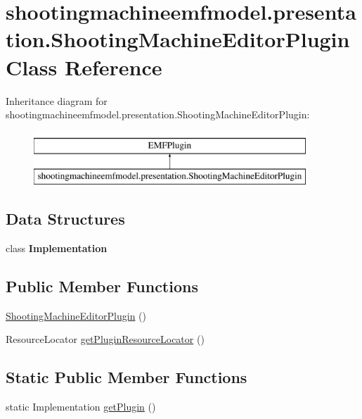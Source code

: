 \hypertarget{classshootingmachineemfmodel_1_1presentation_1_1_shooting_machine_editor_plugin}{\section{shootingmachineemfmodel.\-presentation.\-Shooting\-Machine\-Editor\-Plugin Class Reference}
\label{classshootingmachineemfmodel_1_1presentation_1_1_shooting_machine_editor_plugin}
}
Inheritance diagram for shootingmachineemfmodel.\-presentation.\-Shooting\-Machine\-Editor\-Plugin\-:\begin{figure}[H]
\begin{center}
\leavevmode
\includegraphics[height=2.000000cm]{classshootingmachineemfmodel_1_1presentation_1_1_shooting_machine_editor_plugin}
\end{center}
\end{figure}
\subsection*{Data Structures}
\begin{DoxyCompactItemize}
\item 
class {\bfseries Implementation}
\end{DoxyCompactItemize}
\subsection*{Public Member Functions}
\begin{DoxyCompactItemize}
\item 
\hyperlink{classshootingmachineemfmodel_1_1presentation_1_1_shooting_machine_editor_plugin_a6fb0c6314865f1f824ef4ae0198e417f}{Shooting\-Machine\-Editor\-Plugin} ()
\item 
Resource\-Locator \hyperlink{classshootingmachineemfmodel_1_1presentation_1_1_shooting_machine_editor_plugin_a7b370421d499f5d9f78af42b4162d3f9}{get\-Plugin\-Resource\-Locator} ()
\end{DoxyCompactItemize}
\subsection*{Static Public Member Functions}
\begin{DoxyCompactItemize}
\item 
static Implementation \hyperlink{classshootingmachineemfmodel_1_1presentation_1_1_shooting_machine_editor_plugin_ab4b5b7c8cfbeda2ced7c5751dab070e0}{get\-Plugin} ()
\end{DoxyCompactItemize}
